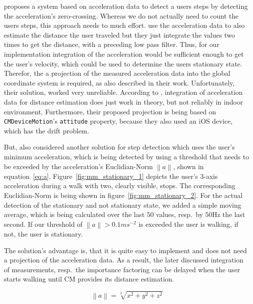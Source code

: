 \citet{wang:wlan} proposes a system based on acceleration data to detect a users steps by detecting the acceleration's zero-crossing. Whereas we do not actually need to count the users steps, this approach needs to much effort. \citet{shanklin:embedded_sensors} use the acceleration data to also estimate the distance the user traveled but they just integrate the values two times to get the distance, with a preceding low pass filter. Thus, for our implementation integration of the acceleration would be sufficient enough to get the user's velocity, which could be used to determine the users stationary state. Therefor, the a projection of the measured acceleration data into the global coordinate system is required, as also described in their work. Unfortunately, their solution, worked very unreliable. According to \citet{wang:wlan}, integration of acceleration data for distance estimation does just work in theory, but not reliably in indoor environment. Furthermore, their proposed projection is being based on \texttt{CMDeviceMotion}'s \texttt{attitude} property, because they also used an iOS device, which has the drift problem.

But, \citet{shanklin:embedded_sensors} also considered another solution for step detection which uses the user's minimum acceleration, which is being detected by using a threshold that needs to be exceeded by the acceleration's Euclidian-Norm $\left\lVert a \right\rVert$, shown in equation~\ref{eq:a}. Figure~\ref{fig:mm_stationary_1} depicts the user's 3-axis acceleration during a walk with two, clearly visible, stops. The corresponding Euclidian-Norm is being shown in figure~\ref{fig:mm_stationary_2}. For the actual detection of the stationary and not stationary state, we added a simple moving average, which is being calculated over the last $50$ values, resp.\ by $50\text{Hz}$ the last second. If our threshold of $\left\lVert a \right\rVert > 0.1 ms^{-2}$ is exceeded the user is walking, if not, the user is stationary.

The solution's advantage is, that it is quite easy to implement and does not need a projection of the acceleration data. As a result, the later discussed integration of measurements, resp.\ the importance factoring can be delayed when the user starts walking until \acs{CM} provides its distance estimation.
 
\begin{equation} \label{eq:a}
	\left\lVert a \right\rVert = \sqrt[2]{x^{2}+y^{2}+z^{2}}
\end{equation}

